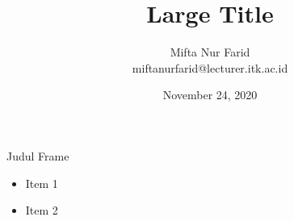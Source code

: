 \documentclass[aspectratio=169]{beamer}
\author{Mifta Nur Farid\\ 
        miftanurfarid@lecturer.itk.ac.id}
\title{\LARGE{Large
    \newline Title  }}
\institute{Electrical Engineering \\ Institut Teknologi Kalimantan}
\date{\tiny November 24, 2020}
\begin{document}
\begin{frame}[t,plain]
\titlepage
\end{frame}

\begin{frame}{Judul Frame}
	\begin{itemize}
		\item Item 1
		\item Item 2
	\end{itemize}
\end{frame}
\end{document}
